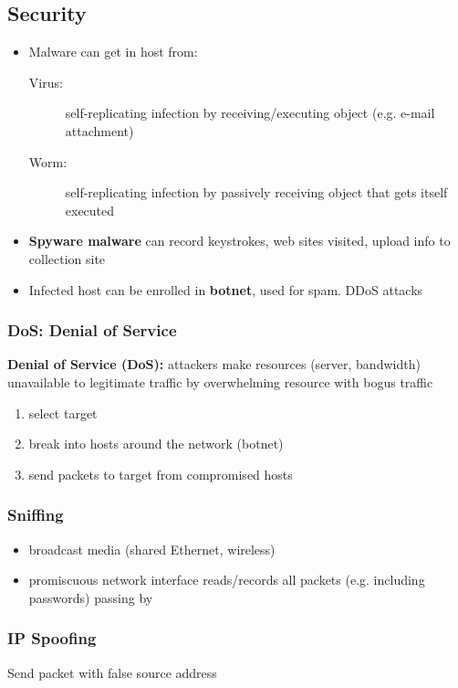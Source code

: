 \documentclass[12pt, a4paper]{article}
\begin{document}
\begin{multicols*}{2}
\subsection{Security}
\begin{itemize}
	\item Malware can get in host from:
	\begin{description}
		\item[Virus:] self-replicating infection by receiving/executing object (e.g. e-mail attachment)
		\item[Worm:] self-replicating infection by passively receiving object that gets itself executed
	\end{description}
	\item \textbf{Spyware malware} can record keystrokes, web sites visited, upload info to collection site
	\item Infected host can be enrolled in \textbf{botnet}, used for spam. DDoS attacks
\end{itemize}
\subsubsection{DoS: Denial of Service}
\textbf{Denial of Service (DoS):} attackers make resources (server, bandwidth) unavailable to legitimate traffic by overwhelming resource with bogus traffic
\begin{enumerate}
	\item select target
	\item break into hosts around the network (botnet)
	\item send packets to target from compromised hosts
\end{enumerate}
\subsubsection{Sniffing}
\begin{itemize}
	\item broadcast media (shared Ethernet, wireless)
	\item promiscuous network interface reads/records all packets (e.g. including passwords) passing by
\end{itemize}
\subsubsection{IP Spoofing}
Send packet with false source address


\end{multicols*}	
\end{document}
